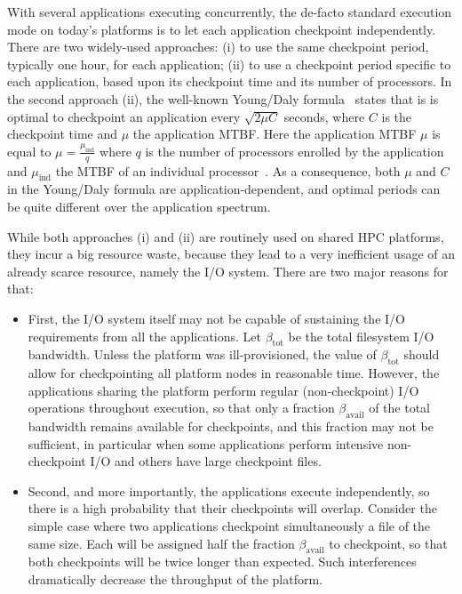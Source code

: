 \documentclass{article}
\newcommand{\muind}{\mu_{\text{ind}}}
\newcommand{\bandtotal}{\beta_{\text{tot}}}
\newcommand{\bandavail}{\beta_{\text{avail}}}
\begin{document}
With several applications executing concurrently, the de-facto standard execution mode on today's platforms is to let each application checkpoint independently. There are two widely-used approaches: (i) to use the same checkpoint period, typically one hour, for each application; (ii) to use a checkpoint period specific to each application, based upon its checkpoint time and its number of processors. In the second approach (ii), the well-known Young/Daly formula~\cite{young74,daly04} states that is is optimal to checkpoint an application
every $\sqrt{2 \mu C}$ seconds, where $C$ is the checkpoint time and $\mu$ the application MTBF.
Here the application MTBF $\mu$ is equal to $\mu = \frac{\muind}{q}$ where $q$ is the number of processors enrolled by the application and $\muind$ the MTBF of an individual processor~\cite{springer-monograph}. As a consequence, both $\mu$ and $C$ 
in the Young/Daly formula are application-dependent, and optimal periods can be quite different
over the application spectrum.

While both approaches (i) and (ii) are routinely used on shared HPC platforms, they incur a
big resource waste, because they lead to a very inefficient usage of an already scarce resource, namely the I/O system. There are two major reasons for that:
\begin{itemize}
\item First, the I/O system itself may not be capable of sustaining the I/O requirements from all the applications. Let $\bandtotal$ be the total filesystem I/O bandwidth. Unless the platform was ill-provisioned, the value of $\bandtotal$ should allow for checkpointing all platform nodes
in reasonable time. However, the applications sharing the platform perform regular (non-checkpoint)
I/O operations throughout execution, so that only a fraction $\bandavail$ of the total  bandwidth remains available for checkpoints, and this fraction may not be sufficient, in particular when some applications perform
intensive non-checkpoint I/O and others have large checkpoint files.
\item Second, and more importantly, the applications execute independently, so there is a high probability that their checkpoints will overlap. Consider the simple case where two applications checkpoint simultaneously a file of the same size. Each will be assigned half the fraction $\bandavail$
to checkpoint, so that both checkpoints will be twice longer than expected. Such interferences dramatically decrease the throughput of the platform.
\end{itemize}
\end{document}
